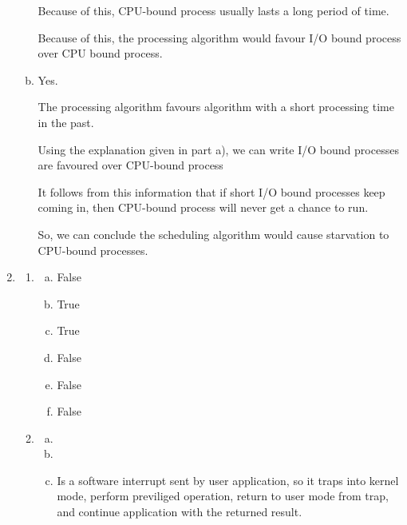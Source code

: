 \documentclass[12pt]{article}
\begin{document}
\begin{enumerate}[1.]
\begin{enumerate}[a)]
        \bigskip

        Because of this, CPU-bound process usually lasts a long period of time.

        \bigskip

        Because of this, the processing algorithm would favour I/O bound process
        over CPU bound process.

        \item

        Yes.

        \bigskip

        The processing algorithm favours algorithm with a short processing time in the past.

        \bigskip

        Using the explanation given in part a), we can write I/O bound processes are favoured
        over CPU-bound process

        \bigskip

        It follows from this information that if short I/O bound processes keep coming in,
        then CPU-bound process will never get a chance to run.

        \bigskip

        So, we can conclude the scheduling algorithm would cause starvation to CPU-bound processes.

    \end{enumerate}

    \item

    \begin{enumerate}[1)]
        \item

        \begin{enumerate}[a)]
            \item False
            \item True
            \item True
            \item False
            \item False
            \item False
        \end{enumerate}

        \item

        \begin{enumerate}[a)]
            \item
            \item
            \item Is a software interrupt sent by user application, so it
            traps into kernel mode, perform previliged operation, return to user mode from trap,
            and continue application with the returned result.
        \end{enumerate}
    \end{enumerate}


\end{enumerate}
\end{document}
